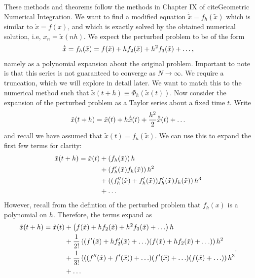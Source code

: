 \documentclass{report}
\theoremstyle{exampstyle} \newtheorem{example}[theorem]{Example}
\theoremstyle{exampstyle} \newtheorem{remark}[theorem]{Remark}
\theoremstyle{exampstyle} \newtheorem{definition}[theorem]{Definition}
\theoremstyle{exampstyle} \newtheorem{lemma}[theorem]{Lemma}
\begin{document}
These methods and theorems follow the methods in Chapter IX of cite{Geometric Numerical Integration}.
We want to find a modified equation $\dot{\tilde{x}} = f_h (\tilde{x})$ which is similar to $\dot{x} = f(x)$,
and which is exactly solved by the obtained numerical solution, i.e, $x_n = \tilde{x}(nh)$.
We expect the perturbed problem to be of the form
\begin{equation*}
	\dot{\tilde{x}} = f_h(\tilde{x}) = f(\tilde{x}) + h f_2(\tilde{x}) + h^2 f_3(\tilde{x}) + \mathellipsis,
\end{equation*}
namely as a polynomial expansion about the original problem. Important to note is that this series is not guaranteed to converge as $N \rightarrow \infty$.
We require a truncation, which we will explore in detail later.
We want to match this to the numerical method such that $\tilde{x}(t+h) \equiv \Phi_h(\tilde{x}(t))$.
Now consider the expansion of the perturbed problem as a Taylor series about a fixed time $t$. Write
\begin{equation*}
	\tilde{x}(t+h) = \tilde{x}(t) + h \dot{\tilde{x}}(t) + \frac{h^2}{2} \ddot{\tilde{x}}(t) + \mathellipsis
\end{equation*}
and recall we have assumed that $\tilde{x}(t) = f_h(\tilde{x})$.
We can use this to expand the first few terms for clarity:
\begin{equation*}
	\begin{aligned}
		\tilde{x}(t+h) = \tilde{x}(t) &+ \left(
			f_h(\tilde{x})
		\right)h \\
		&+ \left(
			f'_h(\tilde{x})f_h(\tilde{x})
		\right)h^2 \\
		&+ \left(
			(f''_h(\tilde{x})+f'_h(\tilde{x}))f'_h(\tilde{x})f_h(\tilde{x})
		\right)h^3 \\
		&+ \mathellipsis
	\end{aligned}
\end{equation*}
However, recall from the defintion of the perturbed problem that $f_h(x)$ is a polynomial on $h$.
Therefore, the terms expand as
\begin{equation*}
	\begin{aligned}
		\tilde{x}(t+h) = \tilde{x}(t) &+ \left(
			f(\tilde{x}) + h f_2(\tilde{x}) + h^2 f_3(\tilde{x}) + \mathellipsis
 		\right)h \\
		&+ \frac{1}{2!}\left(
			(f'(\tilde{x}) + h f'_2(\tilde{x})  + \mathellipsis)
			(f(\tilde{x}) + h f_2(\tilde{x}) + \mathellipsis)
		\right)h^2 \\
		&+ \frac{1}{3!}\left(
			((f''(\tilde{x}) + f'(\tilde{x})) + \mathellipsis)
			(f'(\tilde{x}) + \mathellipsis)
			(f(\tilde{x}) + \mathellipsis)
		\right)h^3 \\
		&+ \mathellipsis
	\end{aligned}.
\end{equation*}
\end{document}

